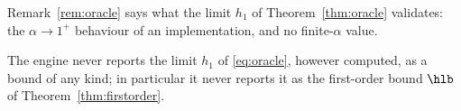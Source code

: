 
Remark~\ref{rem:oracle} says what the limit $h_1$ of
Theorem~\ref{thm:oracle} validates: the $\alpha\to1^{+}$ behaviour of an
implementation, and no finite-$\alpha$ value.

\begin{requirement}\label{req:limit-not-a-bound}
The engine never reports the limit $h_1$ of \eqref{eq:oracle}, however
computed, as a bound of any kind; in particular it never reports it as the
first-order bound $\hlb$ of Theorem~\ref{thm:firstorder}.
\end{requirement}
